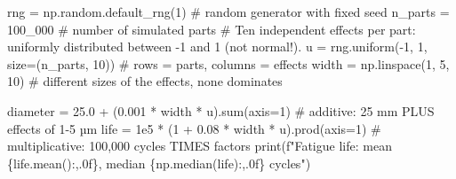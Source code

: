 \documentclass[
  letterpaper,
  DIV=11,
  numbers=noendperiod]{scrreprt}
\newenvironment{Shaded}{\begin{snugshade}}{\end{snugshade}}
\newcommand{\BuiltInTok}[1]{\textcolor[rgb]{0.00,0.23,0.31}{#1}}
\newcommand{\CommentTok}[1]{\textcolor[rgb]{0.37,0.37,0.37}{#1}}
\newcommand{\DecValTok}[1]{\textcolor[rgb]{0.68,0.00,0.00}{#1}}
\newcommand{\FloatTok}[1]{\textcolor[rgb]{0.68,0.00,0.00}{#1}}
\newcommand{\NormalTok}[1]{\textcolor[rgb]{0.00,0.23,0.31}{#1}}
\newcommand{\OperatorTok}[1]{\textcolor[rgb]{0.37,0.37,0.37}{#1}}
\newcommand{\SpecialCharTok}[1]{\textcolor[rgb]{0.37,0.37,0.37}{#1}}
\newcommand{\SpecialStringTok}[1]{\textcolor[rgb]{0.13,0.47,0.30}{#1}}
\begin{document}
\begin{Shaded}
\begin{Highlighting}[]
\NormalTok{rng }\OperatorTok{=}\NormalTok{ np.random.default\_rng(}\DecValTok{1}\NormalTok{)                         }\CommentTok{\# random generator with fixed seed}
\NormalTok{n\_parts }\OperatorTok{=} \DecValTok{100\_000}                                      \CommentTok{\# number of simulated parts}
\CommentTok{\# Ten independent effects per part: uniformly distributed between {-}1 and 1 (not normal!).}
\NormalTok{u }\OperatorTok{=}\NormalTok{ rng.uniform(}\OperatorTok{{-}}\DecValTok{1}\NormalTok{, }\DecValTok{1}\NormalTok{, size}\OperatorTok{=}\NormalTok{(n\_parts, }\DecValTok{10}\NormalTok{))             }\CommentTok{\# rows = parts, columns = effects}
\NormalTok{width }\OperatorTok{=}\NormalTok{ np.linspace(}\DecValTok{1}\NormalTok{, }\DecValTok{5}\NormalTok{, }\DecValTok{10}\NormalTok{)                          }\CommentTok{\# different sizes of the effects, none dominates}

\NormalTok{diameter }\OperatorTok{=} \FloatTok{25.0} \OperatorTok{+}\NormalTok{ (}\FloatTok{0.001} \OperatorTok{*}\NormalTok{ width }\OperatorTok{*}\NormalTok{ u).}\BuiltInTok{sum}\NormalTok{(axis}\OperatorTok{=}\DecValTok{1}\NormalTok{)      }\CommentTok{\# additive: 25 mm PLUS effects of 1{-}5 µm}
\NormalTok{life }\OperatorTok{=} \FloatTok{1e5} \OperatorTok{*}\NormalTok{ (}\DecValTok{1} \OperatorTok{+} \FloatTok{0.08} \OperatorTok{*}\NormalTok{ width }\OperatorTok{*}\NormalTok{ u).prod(axis}\OperatorTok{=}\DecValTok{1}\NormalTok{)       }\CommentTok{\# multiplicative: 100,000 cycles TIMES factors}
\BuiltInTok{print}\NormalTok{(}\SpecialStringTok{f"Fatigue life: mean }\SpecialCharTok{\{}\NormalTok{life}\SpecialCharTok{.}\NormalTok{mean()}\SpecialCharTok{:,.0f\}}\SpecialStringTok{, median }\SpecialCharTok{\{}\NormalTok{np}\SpecialCharTok{.}\NormalTok{median(life)}\SpecialCharTok{:,.0f\}}\SpecialStringTok{ cycles"}\NormalTok{)}


\end{Highlighting}
\end{Shaded}
\end{document}
